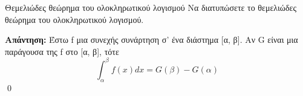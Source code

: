\documentclass[a4paper, 12pt]{article}
\renewenvironment{proof}[1][\textbf{Απάντηση}]{%
  \par\noindent\textbf{#1:} \rmfamily}{\qed\par}
\begin{document}
\begin{theorem}{Θεμελιώδες θεώρημα του ολοκληρωτικού λογισμού}
  Να διατυπώσετε το θεμελιώδες θεώρημα του ολοκληρωτικού λογισμού.
\end{theorem}
\begin{proof}
  Έστω f μια συνεχής συνάρτηση σ’ ένα διάστημα [α, β]. Αν G είναι μια παράγουσα
  της f στο [α, β], τότε
  $$\int_{α}^{β} f (x) dx = G(β) − G(α)$$
\end{proof}

\printindex
\end{document}

